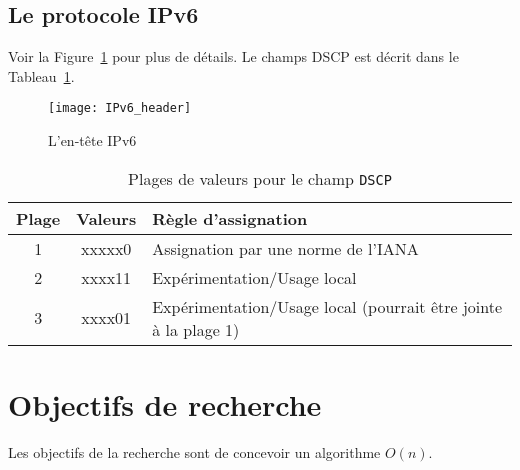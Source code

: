 \subsection{Le protocole IPv6}
Voir la Figure~\ref{fig:IPv6} pour plus de détails. Le champs DSCP est
décrit dans le Tableau~\ref{tab:RangesDSCP}.

\begin{figure}[htb]
\centering
\texttt{[image: IPv6\_header]}
\caption{L'en-tête IPv6}
\label{fig:IPv6}
\end{figure}

\begin{table}[ht]
\caption{Plages de valeurs pour le champ \texttt{DSCP}}
\centering
\begin{tabular}{|c|c|l|}
\hline\rowcolor[gray]{0.8}\color{black}
Plage & Valeurs & Règle d'assignation\\\hline
1 & xxxxx0 & Assignation par une norme de l'IANA\\\hline
2 & xxxx11 & Expérimentation/Usage local\\\hline
3 & xxxx01 & Expérimentation/Usage local (pourrait être jointe à la plage 1)\\\hline
\end{tabular}
\label{tab:RangesDSCP}
\end{table}

\FloatBarrier


\section{Objectifs de recherche}  %
Les objectifs de la recherche sont de concevoir un algorithme $O(n)$.


